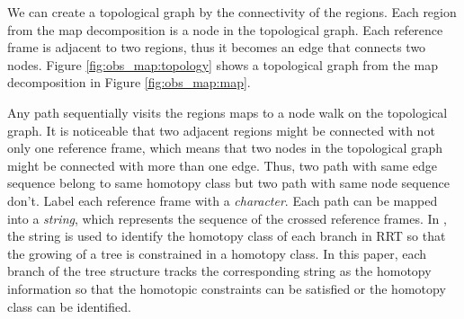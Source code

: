 \documentclass[letterpaper, 10 pt, conference]{ieeeconf}
\begin{document}
We can create a topological graph by the connectivity of the regions.
Each region from the map decomposition is a node in the topological graph.
Each reference frame is adjacent to two regions, thus it becomes an edge that connects two nodes.
Figure \ref{fig:obs_map:topology} shows a topological graph from the map decomposition in Figure \ref{fig:obs_map:map}.

Any path sequentially visits the regions maps to a node walk on the topological graph.
It is noticeable that two adjacent regions might be connected with not only one reference frame, which means that two nodes in the topological graph might be connected with more than one edge.
Thus, two path with same edge sequence belong to same homotopy class but two path with same node sequence don't.  
Label each reference frame with a \emph{character}.
Each path can be mapped into a {\em string}, which represents the sequence of the crossed reference frames.
In \cite{Hernandez201544}, the string is used to identify the homotopy class of each branch in RRT so that the growing of a tree is constrained in a homotopy class.
In this paper, each branch of the tree structure tracks the corresponding string as the homotopy information so that the homotopic constraints can be satisfied or the homotopy class can be identified.


\end{document}
